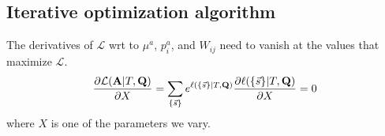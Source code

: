 \documentclass[aps,rmp,twocolumn]{revtex4}
\newcommand{\mat}[1]{{\bf #1}}
\newcommand{\eqp}{p}
\newcommand{\LH}{\mathcal{L}}
\newcommand{\lh}{\ell}
\begin{document}

\subsection*{Iterative optimization algorithm}
The derivatives of $\LH$ wrt to $\mu^a$, $\eqp_i^a$, and $W_{ij}$ need to vanish at the values that maximize $\LH$.
\begin{equation}
	\frac{\partial \LH(\mat{A}|T,\mat{Q})}{\partial X} = \sum_{\{\vec{s}\}} e^{\lh(\{\vec{s}\} |T, \mat{Q})} \frac{\partial \ell(\{\vec{s}\}|T,\mat{Q})}{\partial X} = 0
\end{equation}
where $X$ is one of the parameters we vary.
\end{document}
